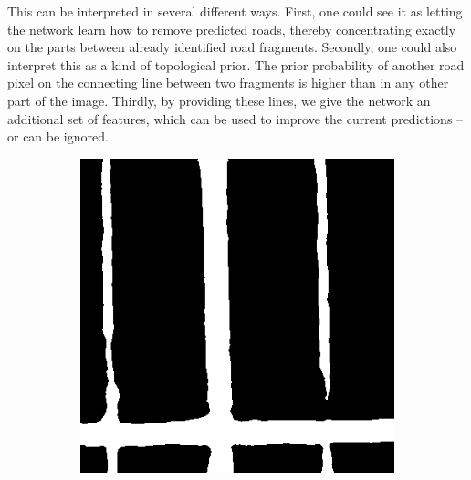  This can be interpreted in several different ways. First, one could see it as letting the network learn how to remove predicted roads, thereby concentrating exactly on the parts between already identified road fragments. Secondly, one could also interpret this as a kind of topological prior. The prior probability of another road pixel on the connecting line between two fragments is higher than in any other part of the image. Thirdly, by providing these lines, we give the network an additional set of features, which can be used to improve the current predictions – or can be ignored.

\begin{figure}[h!]
\centering
  \begin{subfigure}[b]{0.22\linewidth}
    \includegraphics[width=\linewidth]{images/satImage_024_prediction.png}\caption{}
  \end{subfigure}
  \begin{subfigure}[b]{0.22\linewidth}

\end{subfigure}
\end{figure}
